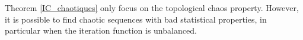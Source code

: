 Theorem \ref{IC_chaotiques} only focus on the topological chaos property.
However, it is possible to find chaotic sequences with bad statistical properties, in particular when the iteration function is unbalanced.
%
%
%
%
%
%
%
%
%
%
%
